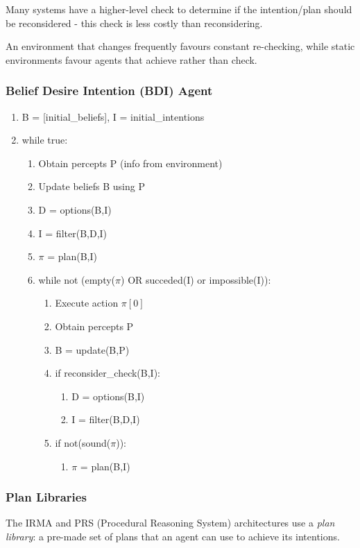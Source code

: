 Many systems have a higher-level check to determine if the intention/plan should be reconsidered - this check is less costly than reconsidering.

An environment that changes frequently favours constant re-checking, while static environments favour agents that achieve rather than check.

\subsubsection{Belief Desire Intention (BDI) Agent}

\begin{enumerate}
\item B = [initial\_beliefs], I = initial\_intentions
\item while true:
\begin{enumerate}
    \item Obtain percepts P (info from environment)
    \item Update beliefs B using P
    \item D = options(B,I)
    \item I = filter(B,D,I)
    \item $\pi$ = plan(B,I)
    \item while not (empty($\pi$) OR succeded(I) or impossible(I)):
    \begin{enumerate}
        \item Execute action $\pi[0]$
        \item Obtain percepts P
        \item B = update(B,P)
        \item if reconsider\_check(B,I):
            \begin{enumerate}[label=\arabic*]
                \item D = options(B,I)
                \item I = filter(B,D,I)
            \end{enumerate}
         \item if not(sound($\pi$)):
            \begin{enumerate}[label=\arabic*]
                \item $\pi$ = plan(B,I)
            \end{enumerate}    
    \end{enumerate}
\end{enumerate}
\end{enumerate}

\subsubsection{Plan Libraries}
The IRMA and PRS (Procedural Reasoning System) architectures use a \emph{plan library}: a pre-made set of plans that an agent can use to achieve its intentions. \\

